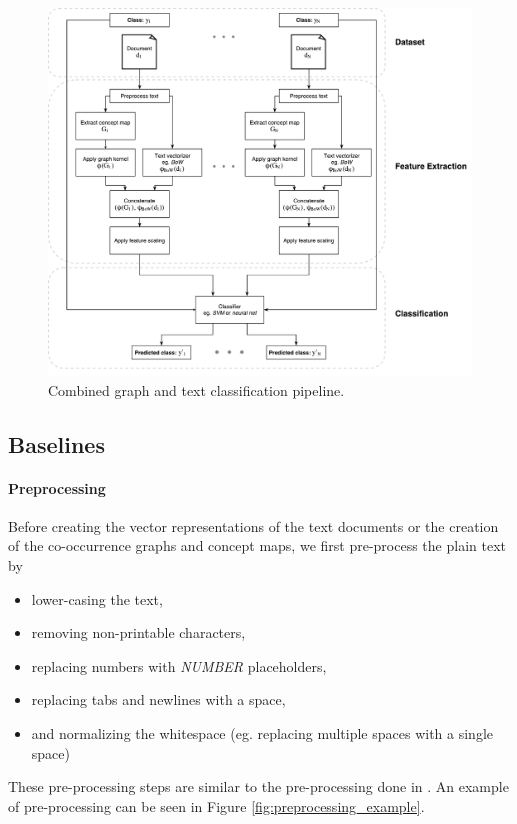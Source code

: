 \begin{figure}[htb!]
	\centering
	\includegraphics[width=0.6\linewidth]{assets/figures/graph_classification_phi_combined_text.pdf}
	\caption[Diagram: Graph kernel and text combined text classification]{Combined graph and text classification pipeline.}
\end{figure}

\subsection{Baselines}
\paragraph{Preprocessing}
Before creating the vector representations of the text documents or the creation of the co-occurrence graphs and concept maps, we first pre-process the plain text by

\begin{itemize}
\item{lower-casing the text,}
\item{removing non-printable characters,}
\item{replacing numbers with \textit{NUMBER} placeholders,}
\item{replacing tabs and newlines with a space,}
\item{and normalizing the whitespace (eg. replacing multiple spaces with a single space)}
\end{itemize}
These pre-processing steps are similar to the pre-processing done in \cite{Cachopo2007}.
An example of pre-processing can be seen in Figure \ref{fig:preprocessing_example}.

